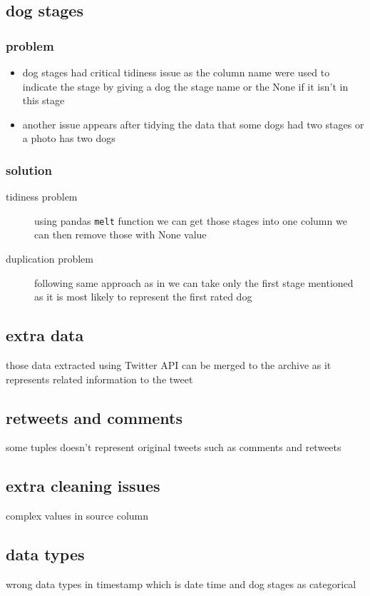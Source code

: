 \documentclass{article}
\begin{document}
\subsection{dog stages}
\subsubsection{problem}
\begin{itemize}
	\item dog stages had critical tidiness issue as the column name were used to indicate the stage by giving a dog the stage name or the None if it isn't in this stage
	\item another issue appears after tidying the data that some dogs had two stages
	      or a photo has two dogs 
\end{itemize}

\subsubsection{solution}
\begin{description}
	\item[tidiness problem] using pandas \lstinline{melt} function we can get those stages into one column we can then remove those with None value 
	\item[duplication problem ] following same approach as in \cite{first_sol} we can take only the first stage mentioned as it is most likely to represent the first rated dog
\end{description}

\subsection{extra data}
those data extracted using Twitter API can be merged to the archive as it represents related
information to the tweet

\subsection{retweets and comments}
some tuples doesn't represent original tweets such as comments and retweets

\subsection{extra cleaning issues }
complex values in source column
 
\subsection{data types}
wrong data types in  timestamp which is date time  and dog stages as  categorical 
 
\end{document}
